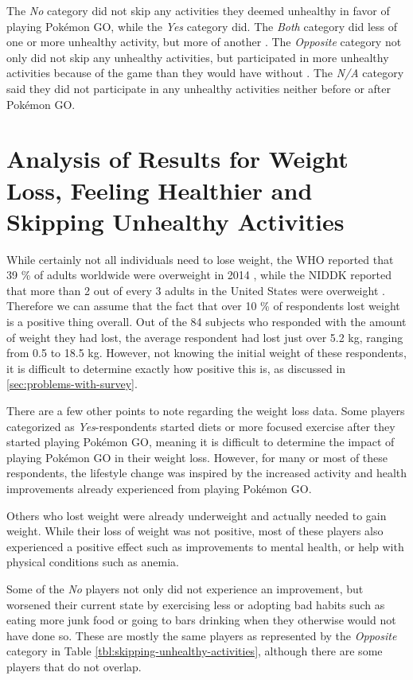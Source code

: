 The \emph{No} category did not skip any activities they deemed unhealthy in favor of playing Pokémon GO, while the \emph{Yes} category did. The \emph{Both} category did less of one or more unhealthy activity, but more of another . The \emph{Opposite} category not only did not skip any unhealthy activities, but participated in more unhealthy activities because of the game than they would have without . The \emph{N/A} category said they did not participate in any unhealthy activities neither before or after Pokémon GO.

\section{Analysis of Results for Weight Loss, Feeling Healthier and Skipping Unhealthy Activities}

While certainly not all individuals need to lose weight, the WHO reported that 39 \% of adults worldwide were overweight in 2014 , while the NIDDK reported that more than 2 out of every 3 adults in the United States were overweight . Therefore we can assume that the fact that over 10 \% of respondents lost weight is a positive thing overall. Out of the 84 subjects who responded with the amount of weight they had lost, the average respondent had lost just over 5.2 kg, ranging from 0.5 to 18.5 kg. However, not knowing the initial weight of these respondents, it is difficult to determine exactly how positive this is, as discussed in \ref{sec:problems-with-survey}.

There are a few other points to note regarding the weight loss data. Some players categorized as \emph{Yes}-respondents started diets or more focused exercise after they started playing Pokémon GO, meaning it is difficult to determine the impact of playing Pokémon GO in their weight loss. However, for many or most of these respondents, the lifestyle change was inspired by the increased activity and health improvements already experienced from playing Pokémon GO.

Others who lost weight were already underweight and actually needed to gain weight. While their loss of weight was not positive, most of these players also experienced a positive effect such as improvements to mental health, or help with physical conditions such as anemia.

Some of the \emph{No} players not only did not experience an improvement, but worsened their current state by exercising less or adopting bad habits such as eating more junk food or going to bars drinking when they otherwise would not have done so. These are mostly the same players as represented by the \emph{Opposite} category in Table \ref{tbl:skipping-unhealthy-activities}, although there are some players that do not overlap.

